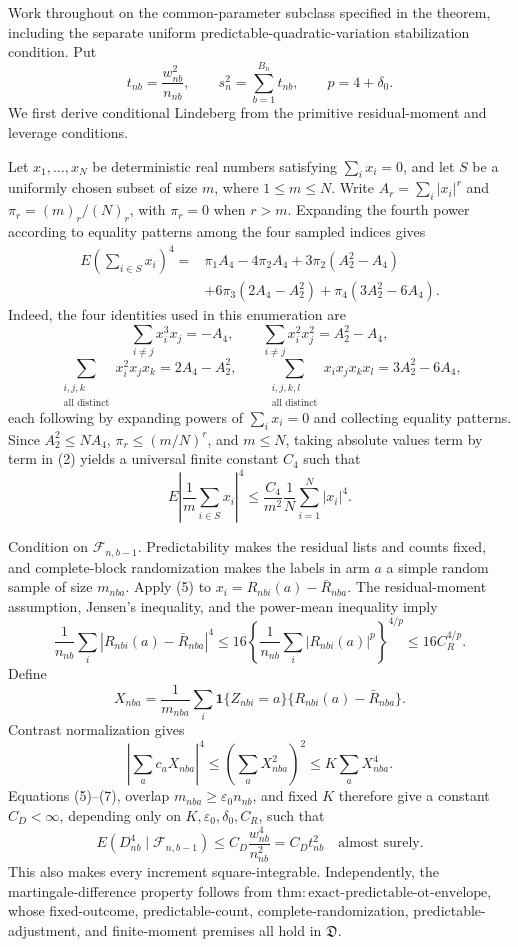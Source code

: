 Work throughout on the common-parameter subclass specified in the theorem,
including the separate uniform predictable-quadratic-variation stabilization
condition.  Put
\[
t_{nb}=\frac{w_{nb}^2}{n_{nb}},\qquad
s_n^2=\sum_{b=1}^{B_n}t_{nb},\qquad p=4+\delta_0.
\tag{1}
\]
We first derive conditional Lindeberg from the primitive residual-moment and
leverage conditions.

Let \(x_1,\ldots,x_N\) be deterministic real numbers satisfying
\(\sum_i x_i=0\), and let \(S\) be a uniformly chosen subset of size
\(m\), where \(1\le m\le N\).  Write
\(A_r=\sum_i|x_i|^r\) and \(\pi_r=(m)_r/(N)_r\), with \(\pi_r=0\) when
\(r>m\).  Expanding the fourth power according to equality patterns among
the four sampled indices gives
\[
\begin{aligned}
E\left(\sum_{i\in S}x_i\right)^4
={}&\pi_1A_4-4\pi_2A_4+3\pi_2(A_2^2-A_4)\\
&+6\pi_3(2A_4-A_2^2)+\pi_4(3A_2^2-6A_4).
\end{aligned}
\tag{2}
\]
Indeed, the four identities used in this enumeration are
\[
\sum_{i\ne j}x_i^3x_j=-A_4,
\qquad
\sum_{i\ne j}x_i^2x_j^2=A_2^2-A_4,
\tag{3}
\]
\[
\sum_{\substack{i,j,k\\\text{all distinct}}}x_i^2x_jx_k
=2A_4-A_2^2,
\qquad
\sum_{\substack{i,j,k,l\\\text{all distinct}}}x_ix_jx_kx_l
=3A_2^2-6A_4,
\tag{4}
\]
each following by expanding powers of \(\sum_i x_i=0\) and collecting
equality patterns.  Since \(A_2^2\le NA_4\),
\(\pi_r\le(m/N)^r\), and \(m\le N\), taking absolute values term by term
in (2) yields a universal finite constant \(C_4\) such that
\[
E\left|\frac1m\sum_{i\in S}x_i\right|^4
\le\frac{C_4}{m^2}\frac1N\sum_{i=1}^N|x_i|^4.
\tag{5}
\]

Condition on \(\mathcal F_{n,b-1}\).  Predictability makes the residual
lists and counts fixed, and complete-block randomization makes the labels in
arm \(a\) a simple random sample of size \(m_{nba}\).  Apply (5) to
\(x_i=R_{nbi}(a)-\bar R_{nba}\).  The residual-moment assumption, Jensen's
inequality, and the power-mean inequality imply
\[
\frac1{n_{nb}}\sum_i|R_{nbi}(a)-\bar R_{nba}|^4
\le16\left\{\frac1{n_{nb}}\sum_i|R_{nbi}(a)|^p\right\}^{4/p}
\le16C_R^{4/p}.
\tag{6}
\]
Define
\[
X_{nba}=\frac1{m_{nba}}\sum_i\mathbf1\{Z_{nbi}=a\}
\{R_{nbi}(a)-\bar R_{nba}\}.
\]
Contrast normalization gives
\[
\left|\sum_ac_aX_{nba}\right|^4
\le\left(\sum_aX_{nba}^2\right)^2
\le K\sum_aX_{nba}^4.
\tag{7}
\]
Equations (5)--(7), overlap
\(m_{nba}\ge\varepsilon_0n_{nb}\), and fixed \(K\) therefore give a
constant \(C_D<\infty\), depending only on
\(K,\varepsilon_0,\delta_0,C_R\), such that
\[
E(D_{nb}^4\mid\mathcal F_{n,b-1})
\le C_D\frac{w_{nb}^4}{n_{nb}^2}=C_Dt_{nb}^2
\quad\text{almost surely}.
\tag{8}
\]
This also makes every increment square-integrable.  Independently, the
martingale-difference property follows from
\(\mathrm{thm:exact\text{-}predictable\text{-}ot\text{-}envelope}\), whose
fixed-outcome, predictable-count, complete-randomization, predictable-
adjustment, and finite-moment premises all hold in \(\mathfrak D\).

